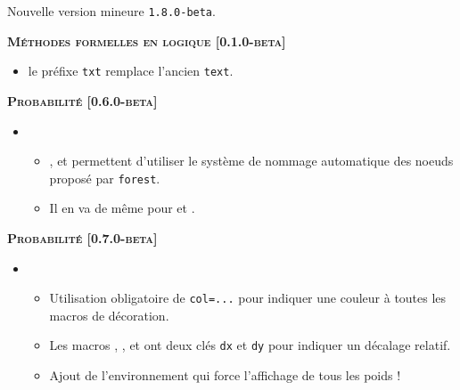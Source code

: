 Nouvelle version mineure \verb+1.8.0-beta+.




\begin{center}
    \textbf{\textsc{Méthodes formelles en logique [0.1.0-beta]}}
\end{center}

\begin{itemize}[itemsep=.5em]
    \item {}
          le préfixe \verb#txt# remplace l'ancien \verb#text#.
\end{itemize}


\separation




\begin{center}
    \textbf{\textsc{Probabilité [0.6.0-beta]}}
\end{center}

\begin{itemize}[itemsep=.5em]
    \item {}
    \begin{itemize}[itemsep=.5em]
        \item {},  et  permettent d'utiliser le système de nommage automatique des noeuds proposé par \verb#forest#.
        
        \item Il en va de même pour  et .
    \end{itemize}
\end{itemize}


\begin{center}
    \textbf{\textsc{Probabilité [0.7.0-beta]}}
\end{center}

\begin{itemize}[itemsep=.5em]
    \item {}
    \begin{itemize}[itemsep=.5em]
        \item Utilisation obligatoire de \verb#col=...# pour indiquer une couleur à toutes les macros de décoration.
        
        \item Les macros , , 
               et 
              ont deux clés \verb#dx# et \verb#dy# pour indiquer un décalage relatif.
        
        \item Ajout de l'environnement  qui force l'affichage de tous les poids !
    \end{itemize}
\end{itemize}


